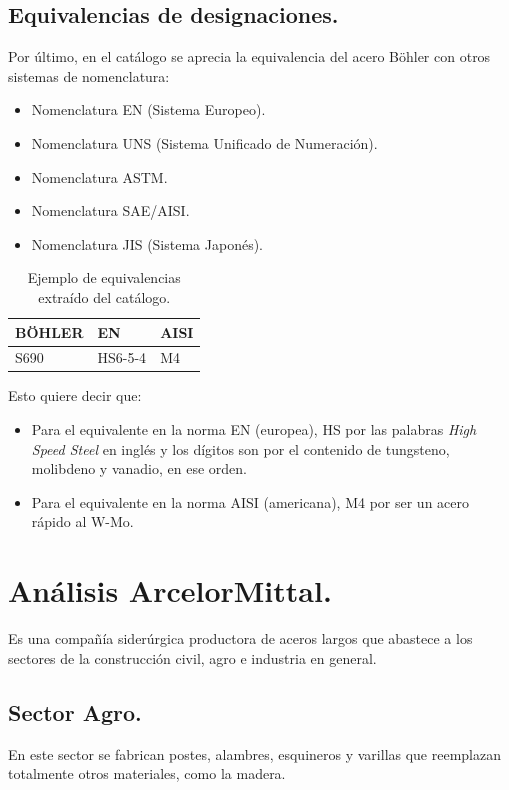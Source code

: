 \documentclass[12pt,a4paper]{article}
\begin{document}
\subsection{Equivalencias de designaciones.}
Por último, en el catálogo se aprecia la equivalencia del acero Böhler con otros sistemas de nomenclatura:

\begin{itemize}
    \item Nomenclatura EN (Sistema Europeo).
    \item Nomenclatura UNS (Sistema Unificado de Numeración).
    \item Nomenclatura ASTM.
    \item Nomenclatura SAE/AISI.
    \item Nomenclatura JIS (Sistema Japonés).
\end{itemize}

\begin{table}[h!]
    \centering
    \begin{tabular}{lll}
        \hline
        \textbf{BÖHLER} & \textbf{EN} & \textbf{AISI} \\ \hline
        S690 & HS6-5-4 & M4 \\ \hline
    \end{tabular}
    \caption{Ejemplo de equivalencias extraído del catálogo.}
    \label{tab:equivalencias-bohler}
\end{table}
Esto quiere decir que:

\begin{itemize}
    \item Para el equivalente en la norma EN (europea), HS por las palabras \textit{High Speed Steel} en inglés y los dígitos son por el contenido de tungsteno, molibdeno y vanadio, en ese orden.
    \item Para el equivalente en la norma AISI (americana), M4 por ser un acero rápido al W-Mo.
\end{itemize}

\section{Análisis ArcelorMittal.}
Es una compañía siderúrgica productora de aceros largos que abastece a los sectores de la construcción civil, agro e industria en general.

\subsection{Sector Agro.}
En este sector se fabrican postes, alambres, esquineros y varillas que reemplazan totalmente otros materiales, como la madera.
\end{document}
